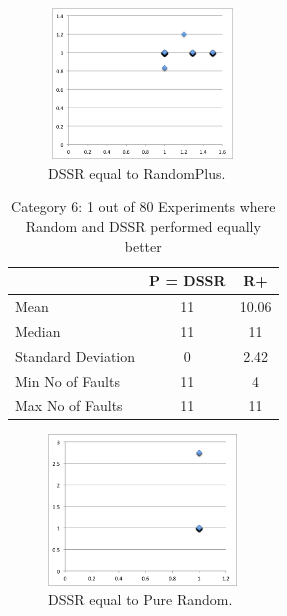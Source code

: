 \documentclass[conference]{IEEEtran}
\begin{document}
\begin{figure}[ht]
\centering
\includegraphics[width=5cm,height=4cm]{DSSRequaltoRandomPlus5.png}
\caption{DSSR equal to RandomPlus.}
\label{fig:DSSRequaltoRandomPlus}
\end{figure}



\begin{table}[H]
\caption{Category 6: 1 out of 80 Experiments where Random and DSSR performed equally better}
\centering
\begin{tabular}{|l|c|c|}
\hline\hline
 				& P = DSSR			&  R+ \\
\hline
Mean  			&    11				&  10.06\\
Median 			&    11 				&  11\\
Standard Deviation 	&    0					&  2.42\\
Min No of Faults	&    11				&  4\\
Max No of Faults 	&    11				&  11\\
\hline
\end{tabular}
\label{table:DSSRequaltoRandom}
\end{table}

\begin{figure}[H]
\centering
\includegraphics[width=5cm,height=4cm]{DSSRequaltoPureRandom5.png}
\caption{DSSR equal to Pure Random.}
\label{fig:DSSRequaltoRandom}
\end{figure}




\end{document}
